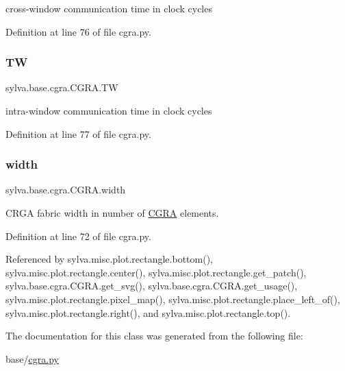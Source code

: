 cross-\/window communication time in clock cycles 



Definition at line 76 of file cgra.\+py.

\mbox{\label{classsylva_1_1base_1_1cgra_1_1_c_g_r_a_a0bab5c20e9d084928b52b87d875f838b}} 
\subsubsection{\texorpdfstring{TW}{TW}}
{\footnotesize\ttfamily sylva.\+base.\+cgra.\+C\+G\+R\+A.\+TW}



intra-\/window communication time in clock cycles 



Definition at line 77 of file cgra.\+py.

\mbox{\label{classsylva_1_1base_1_1cgra_1_1_c_g_r_a_a303858bc048fcc89e1b223bc6b9082bd}} 
\subsubsection{\texorpdfstring{width}{width}}
{\footnotesize\ttfamily sylva.\+base.\+cgra.\+C\+G\+R\+A.\+width}



C\+R\+GA fabric width in number of \hyperlink{classsylva_1_1base_1_1cgra_1_1_c_g_r_a}{C\+G\+RA} elements. 



Definition at line 72 of file cgra.\+py.



Referenced by sylva.\+misc.\+plot.\+rectangle.\+bottom(), sylva.\+misc.\+plot.\+rectangle.\+center(), sylva.\+misc.\+plot.\+rectangle.\+get\+\_\+patch(), sylva.\+base.\+cgra.\+C\+G\+R\+A.\+get\+\_\+svg(), sylva.\+base.\+cgra.\+C\+G\+R\+A.\+get\+\_\+usage(), sylva.\+misc.\+plot.\+rectangle.\+pixel\+\_\+map(), sylva.\+misc.\+plot.\+rectangle.\+place\+\_\+left\+\_\+of(), sylva.\+misc.\+plot.\+rectangle.\+right(), and sylva.\+misc.\+plot.\+rectangle.\+top().



The documentation for this class was generated from the following file\+:\begin{DoxyCompactItemize}
\item 
base/\hyperlink{cgra_8py}{cgra.\+py}\end{DoxyCompactItemize}
